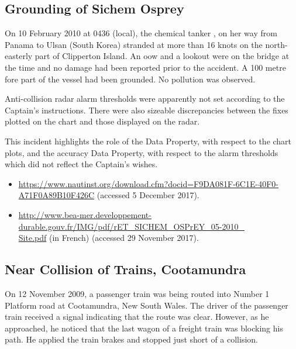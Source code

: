\subsection{Grounding of Sichem Osprey} \label{bkm:incacc:sichemosprey}
On 10 February 2010 at 0436 (local), the chemical tanker , on her way from Panama to Ulsan (South Korea) stranded at more than 16 knots on the north-easterly part of Clipperton Island. An \gls{oow} and a lookout were on the bridge at the time and no damage had been reported prior to the accident. A 100 metre fore part of the vessel had been grounded. No pollution was observed.

Anti-collision radar alarm thresholds were apparently not set according to the Captain's instructions. There were also sizeable discrepancies between the fixes plotted on the chart and those displayed on the radar.

This incident highlights the role of the  Data Property, with respect to the chart plots, and the \gls{accuracy} Data Property, with respect to the alarm thresholds which did not reflect the Captain's wishes.

\begin{samepage}
\begin{itemize}
	\item \raggedright{\href{https://www.nautinst.org/download.cfm?docid=F9DA081F-6C1E-40F0-A71F0A89B10F426C}{https://www.nautinst.org/download.cfm?docid=F9DA081F-6C1E-40F0-A71F0A89B10F426C} (accessed 5 December 2017).}
  \item \raggedright{\href{http://www.bea-mer.developpement-durable.gouv.fr/IMG/pdf/rET_SICHEM_OSPrEY_05-2010_Site.pdf}{http://www.bea-mer.developpement-durable.gouv.fr/IMG/pdf/rET\_SICHEM\_OSPrEY\_05-2010\_\\Site.pdf} (in French) (accessed 29 November 2017).}
\end{itemize}
\end{samepage}


\subsection{Near Collision of Trains, Cootamundra} \label{bkm:incacc:cootamundra}
On 12 November 2009, a passenger train was being routed into Number 1 Platform road at Cootamundra, New South Wales. The driver of the passenger train received a signal indicating that the route was clear. However, as he approached, he noticed that the last wagon of a freight train was blocking his path. He applied the train brakes and stopped just short of a collision.

